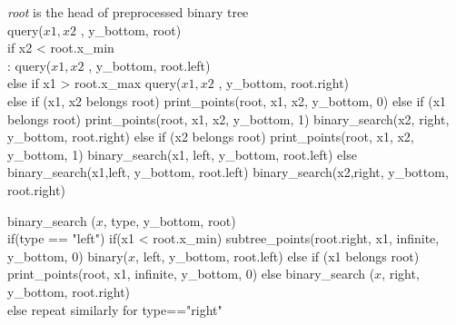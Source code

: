 \documentclass{article}
\begin{document}
\emph{root} is the head of preprocessed binary tree \\
query($x1, x2$ , y\_bottom, root)\\
\hspace{1cm}
\hspace{1cm}if x2 < root.x\_min\\:
\hspace{2cm}    query($x1, x2$ , y\_bottom, root.left)\\
\hspace{1cm}else if x1 > root.x\_max
\hspace{2cm}    query($x1, x2$ , y\_bottom, root.right)\\
\hspace{1cm}else if (x1, x2 belongs root) 
\hspace{2cm} print\_points(root, x1, x2, y\_bottom, 0)  
\hspace{1cm}else if (x1 belongs root)
\hspace{1.5cm} print\_points(root, x1, x2, y\_bottom, 1)
\hspace{1.5cm} binary\_search(x2, right, y\_bottom, root.right)
\hspace{1cm}else if (x2 belongs root)
\hspace{1.5cm} print\_points(root, x1, x2, y\_bottom, 1)
\hspace{1.5cm} binary\_search(x1, left, y\_bottom, root.left)
\hspace{1cm}else 
\hspace{2cm}binary\_search(x1,left, y\_bottom, root.left)
\hspace{2cm}binary\_search(x2,right, y\_bottom, root.right)

binary\_search ($x$, type, y\_bottom, root)\\
\hspace{1cm} if(type == "left")
\hspace{2cm}    if(x1 < root.x\_min)
\hspace{3cm}    subtree\_points(root.right, x1, infinite, y\_bottom, 0)
\hspace{3cm}    binary($x$, left, y\_bottom, root.left)
\hspace{2cm}    else if (x1 belongs root)
\hspace{3cm}      print\_points(root, x1, infinite, y\_bottom, 0)
\hspace{2cm}    else binary\_search ($x$, right, y\_bottom, root.right)\\
\hspace{1cm}else 
\hspace{2cm} repeat similarly for type=="right"
\end{document}
